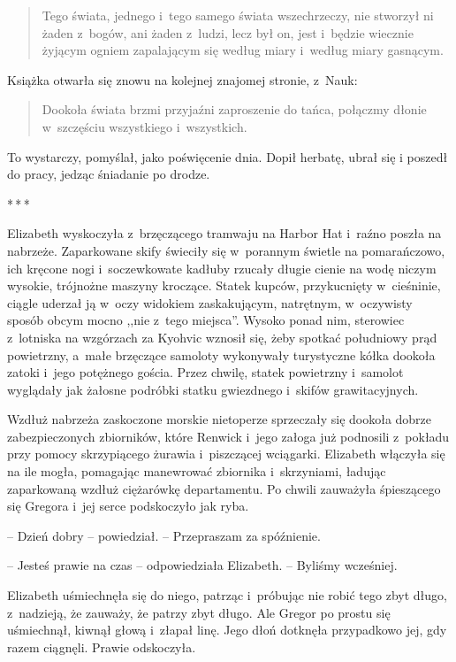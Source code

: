 \documentclass[oneside,polish,12pt,sfheadings]{mwbk}
\newcommand{\threeast}{\bigskip\par\centerline{*\,*\,*}\medskip\par}%
\begin{document}
\begin{quotation}

Tego świata, jednego i~tego samego świata wszechrzeczy, nie
stworzył ni żaden z~bogów, ani żaden z~ludzi, lecz był on, jest i~będzie
wiecznie żyjącym ogniem zapalającym się według miary i~według
miary gasnącym.\\
\end{quotation}
Książka otwarła się znowu na kolejnej znajomej stronie, z~Nauk:

\begin{quotation}
Dookoła świata brzmi przyjaźni zaproszenie do tańca, połączmy
dłonie w~szczęściu wszystkiego i~wszystkich.
\end{quotation} 

To wystarczy, pomyślał, jako poświęcenie dnia. Dopił herbatę, ubrał się
i poszedł do pracy, jedząc śniadanie po drodze.

\threeast

Elizabeth wyskoczyła z~brzęczącego tramwaju na Harbor Hat i~raźno poszła
na nabrzeże. Zaparkowane skify świeciły się w~porannym świetle na
pomarańczowo, ich kręcone nogi i~soczewkowate kadłuby rzucały długie
cienie na wodę niczym wysokie, trójnożne maszyny kroczące. Statek
kupców, przykucnięty w~cieśninie, ciągle uderzał ją w~oczy widokiem
zaskakującym, natrętnym, w~oczywisty sposób obcym mocno ,,nie z~tego
miejsca''. Wysoko ponad nim, sterowiec z~lotniska na wzgórzach za Kyohvic
wznosił się, żeby spotkać południowy prąd powietrzny, a~małe brzęczące
samoloty wykonywały turystyczne kółka dookoła zatoki i~jego potężnego
gościa. Przez chwilę, statek powietrzny i~samolot wyglądały jak żałosne
podróbki statku gwiezdnego i~skifów grawitacyjnych.

Wzdłuż nabrzeża zaskoczone morskie nietoperze sprzeczały się dookoła
dobrze zabezpieczonych zbiorników, które Renwick i~jego załoga już
podnosili z~pokładu przy pomocy skrzypiącego żurawia i~piszczącej
wciągarki. Elizabeth włączyła się na ile mogła, pomagając manewrować
zbiornika i~skrzyniami, ładując zaparkowaną wzdłuż ciężarówkę
departamentu. Po chwili zauważyła śpieszącego się Gregora i~jej serce
podskoczyło jak ryba.

-- Dzień dobry -- powiedział. -- Przepraszam za spóźnienie.

-- Jesteś prawie na czas -- odpowiedziała Elizabeth. -- Byliśmy wcześniej.

Elizabeth uśmiechnęła się do niego, patrząc i~próbując nie robić tego
zbyt długo, z~nadzieją, że zauważy, że patrzy zbyt długo. Ale Gregor po
prostu się uśmiechnął, kiwnął głową i~złapał linę. Jego dłoń dotknęła
przypadkowo jej, gdy razem ciągnęli. Prawie odskoczyła.
\end{document}
